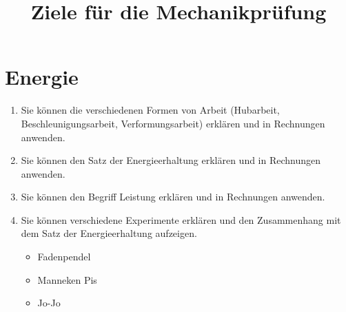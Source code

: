 \documentclass[12pt,a5paper,twoside]{article}
\title{Ziele für die Mechanikprüfung}
\date{}
\begin{document}
\maketitle

\section*{Energie}

\begin{enumerate}
	\item Sie können die verschiedenen Formen von Arbeit (Hubarbeit, Beschleunigungsarbeit, Verformungsarbeit)
		erklären und in Rechnungen anwenden.
	\item Sie können den Satz der Energieerhaltung erklären und in Rechnungen anwenden.
	\item Sie können den Begriff Leistung erklären und in Rechnungen anwenden.
	\item Sie können verschiedene Experimente erklären und den Zusammenhang mit dem Satz der Energieerhaltung aufzeigen.
		\begin{itemize}
			\item Fadenpendel
			\item Manneken Pis
			\item Jo-Jo
		\end{itemize}

\end{enumerate}
\end{document}
